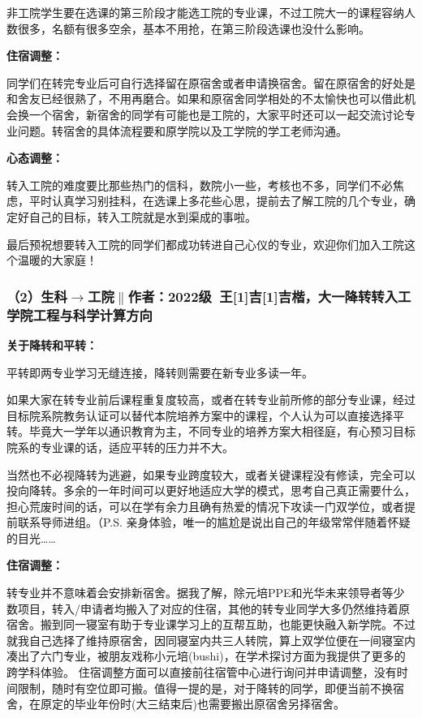 \documentclass[11pt,oneside]{book}
\begin{document}
非工院学生要在选课的第三阶段才能选工院的专业课，不过工院大一的课程容纳人数很多，名额有很多空余，基本不用抢，在第三阶段选课也没什么影响。

\textbf{\textbf{住宿调整}}\textbf{\textbf{：}}

同学们在转完专业后可自行选择留在原宿舍或者申请换宿舍。留在原宿舍的好处是和舍友已经很熟了，不用再磨合。如果和原宿舍同学相处的不太愉快也可以借此机会换一个宿舍，新宿舍的同学有可能也是工院的，大家平时还可以一起交流讨论专业问题。转宿舍的具体流程要和原学院以及工学院的学工老师沟通。

\textbf{\textbf{心态调整}}\textbf{\textbf{：}}

转入工院的难度要比那些热门的信科，数院小一些，考核也不多，同学们不必焦虑，平时认真学习别挂科，在选课上多花些心思，提前去了解工院的几个专业，确定好自己的目标，转入工院就是水到渠成的事啦。

最后预祝想要转入工院的同学们都成功转进自己心仪的专业，欢迎你们加入工院这个温暖的大家庭！

\subsubsection{（2）生科$\to$工院$\parallel$作者：2022级\ 王\hbox{\scalebox{0.6}[1]{吉}\kern-2pt\scalebox{0.6}[1]{吉}}楷，大一降转转入工学院工程与科学计算方向}
\textbf{\textbf{关于降转和平转}}\textbf{\textbf{：}}

平转即两专业学习无缝连接，降转则需要在新专业多读一年。

如果大家在转专业前后课程重复度较高，或者在转专业前所修的部分专业课，经过目标院系院教务认证可以替代本院培养方案中的课程，个人认为可以直接选择平转。毕竟大一学年以通识教育为主，不同专业的培养方案大相径庭，有心预习目标院系的专业课的话，适应平转的压力并不大。

当然也不必视降转为逃避，如果专业跨度较大，或者关键课程没有修读，完全可以投向降转。多余的一年时间可以更好地适应大学的模式，思考自己真正需要什么，担心荒废时间的话，可以在学有余力且确有热爱的情况下攻读一门双学位，或者提前联系导师进组。（P.S. 亲身体验，唯一的尴尬是说出自己的年级常常伴随着怀疑的目光……

\textbf{\textbf{住宿调整}}\textbf{\textbf{：}}

转专业并不意味着会安排新宿舍。据我了解，除元培PPE和光华未来领导者等少数项目，转入/申请者均搬入了对应的住宿，其他的转专业同学大多仍然维持着原宿舍。搬到同一寝室有助于专业课学习上的互帮互助，也能更快融入新学院。不过就我自己选择了维持原宿舍，因同寝室内共三人转院，算上双学位便在一间寝室内凑出了六门专业，被朋友戏称小元培(bushi)，在学术探讨方面为我提供了更多的跨学科体验。
住宿调整方面可以直接前往宿管中心进行询问并申请调整，没有时间限制，随时有空位即可搬。值得一提的是，对于降转的同学，即便当前不换宿舍，在原定的毕业年份时(大三结束后)也需要搬出原宿舍另择宿舍。
\end{document}
